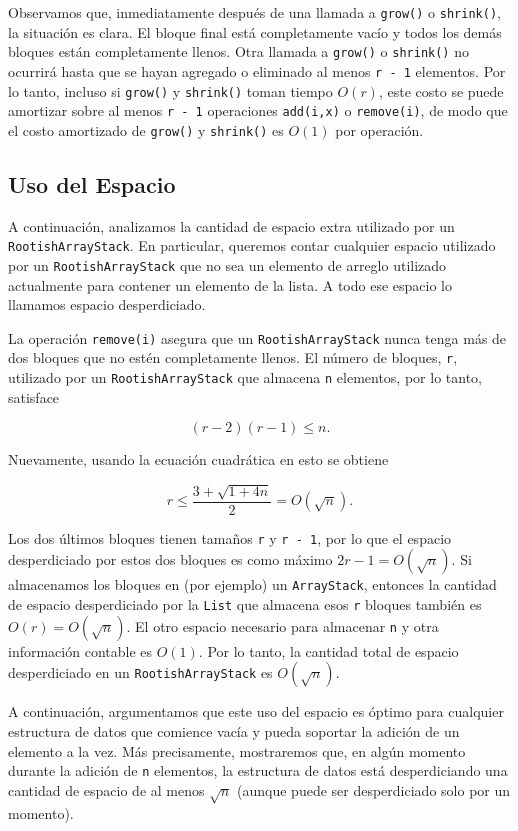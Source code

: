 \documentclass[11pt]{book}
\theoremstyle{plain}
\begin{document}
Observamos que, inmediatamente después de una llamada a \texttt{grow()} o \texttt{shrink()}, la situación es clara. El bloque final está completamente vacío y todos los demás bloques están completamente llenos. Otra llamada a \texttt{grow()} o \texttt{shrink()} no ocurrirá hasta que se hayan agregado o eliminado al menos \texttt{r - 1} elementos. Por lo tanto, incluso si \texttt{grow()} y \texttt{shrink()} toman tiempo $O(r)$, este costo se puede amortizar sobre al menos \texttt{r - 1} operaciones \texttt{add(i,x)} o \texttt{remove(i)}, de modo que el costo amortizado de \texttt{grow()} y \texttt{shrink()} es $O(1)$ por operación.

\subsection{Uso del Espacio}

A continuación, analizamos la cantidad de espacio extra utilizado por un \texttt{RootishArrayStack}. En particular, queremos contar cualquier espacio utilizado por un \texttt{RootishArrayStack} que no sea un elemento de arreglo utilizado actualmente para contener un elemento de la lista. A todo ese espacio lo llamamos espacio desperdiciado.

La operación \texttt{remove(i)} asegura que un \texttt{RootishArrayStack} nunca tenga más de dos bloques que no estén completamente llenos. El número de bloques, \texttt{r}, utilizado por un \texttt{RootishArrayStack} que almacena \texttt{n} elementos, por lo tanto, satisface

$$
(r - 2)(r - 1) \le n .
$$

Nuevamente, usando la ecuación cuadrática en esto se obtiene

$$
r \le \frac{3 + \sqrt{1 + 4n}}{2} = O(\sqrt{n}) .
$$

Los dos últimos bloques tienen tamaños \texttt{r} y \texttt{r - 1}, por lo que el espacio desperdiciado por estos dos bloques es como máximo $2r - 1 = O(\sqrt{n})$. Si almacenamos los bloques en (por ejemplo) un \texttt{ArrayStack}, entonces la cantidad de espacio desperdiciado por la \texttt{List} que almacena esos \texttt{r} bloques también es $O(r) = O(\sqrt{n})$. El otro espacio necesario para almacenar \texttt{n} y otra información contable es $O(1)$. Por lo tanto, la cantidad total de espacio desperdiciado en un \texttt{RootishArrayStack} es $O(\sqrt{n})$.

A continuación, argumentamos que este uso del espacio es óptimo para cualquier estructura de datos que comience vacía y pueda soportar la adición de un elemento a la vez. Más precisamente, mostraremos que, en algún momento durante la adición de \texttt{n} elementos, la estructura de datos está desperdiciando una cantidad de espacio de al menos $\sqrt{n}$ (aunque puede ser desperdiciado solo por un momento).
\end{document}
